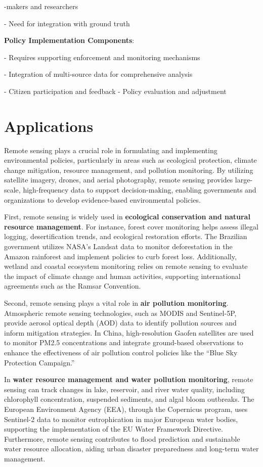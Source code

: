 \documentclass[
  letterpaper,
]{scrbook}
\begin{document}
-makers and researchers

- Need for integration with ground truth

\textbf{Policy Implementation Components}:

- Requires supporting enforcement and monitoring mechanisms

- Integration of multi-source data for comprehensive analysis

- Citizen participation and feedback - Policy evaluation and adjustment

\section{Applications}\label{applications-2}

Remote sensing plays a crucial role in formulating and implementing
environmental policies, particularly in areas such as ecological
protection, climate change mitigation, resource management, and
pollution monitoring. By utilizing satellite imagery, drones, and aerial
photography, remote sensing provides large-scale, high-frequency data to
support decision-making, enabling governments and organizations to
develop evidence-based environmental policies.

First, remote sensing is widely used in \textbf{ecological conservation
and natural resource management}. For instance, forest cover monitoring
helps assess illegal logging, desertification trends, and ecological
restoration efforts. The Brazilian government utilizes NASA's Landsat
data to monitor deforestation in the Amazon rainforest and implement
policies to curb forest loss. Additionally, wetland and coastal
ecosystem monitoring relies on remote sensing to evaluate the impact of
climate change and human activities, supporting international agreements
such as the Ramsar Convention.

Second, remote sensing plays a vital role in \textbf{air pollution
monitoring}. Atmospheric remote sensing technologies, such as MODIS and
Sentinel-5P, provide aerosol optical depth (AOD) data to identify
pollution sources and inform mitigation strategies. In China,
high-resolution Gaofen satellites are used to monitor PM2.5
concentrations and integrate ground-based observations to enhance the
effectiveness of air pollution control policies like the ``Blue Sky
Protection Campaign.''

In \textbf{water resource management and water pollution monitoring},
remote sensing can track changes in lake, reservoir, and river water
quality, including chlorophyll concentration, suspended sediments, and
algal bloom outbreaks. The European Environment Agency (EEA), through
the Copernicus program, uses Sentinel-2 data to monitor eutrophication
in major European water bodies, supporting the implementation of the EU
Water Framework Directive. Furthermore, remote sensing contributes to
flood prediction and sustainable water resource allocation, aiding urban
disaster preparedness and long-term water management.
\end{document}
